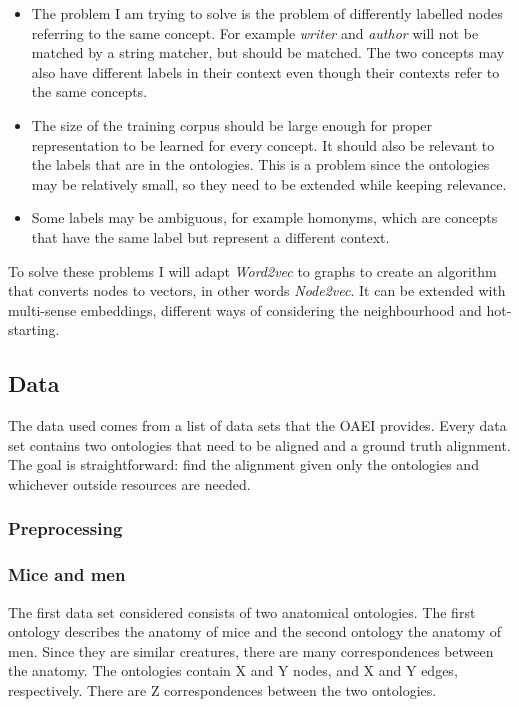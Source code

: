 \documentclass{article}
\begin{document}
 \begin{itemize}
  \item The problem I am trying to solve is the problem of differently labelled nodes referring to the same concept. For example \emph{writer} and \emph{author} will not be matched by a string matcher, but should be matched. The two concepts may also have different labels in their context even though their contexts refer to the same concepts.
  \item The size of the training corpus should be large enough for proper representation to be learned for every concept. It should also be relevant to the labels that are in the ontologies. This is a problem since the ontologies may be relatively small, so they need to be extended while keeping relevance.
  \item Some labels may be ambiguous, for example homonyms, which are concepts that have the same label but represent a different context.
 \end{itemize}
 
 To solve these problems I will adapt \emph{Word2vec} to graphs to create an algorithm that converts nodes to vectors, in other words \emph{Node2vec}. It can be extended with multi-sense embeddings, different ways of considering the neighbourhood and hot-starting.
 
  \subsection{Data}
 The data used comes from a list of data sets that the OAEI provides\cite{euzenat2013ontology}. %
 Every data set contains two ontologies that need to be aligned and a ground truth alignment. The goal is straightforward: find the alignment given only the ontologies and whichever outside resources are needed.

 \subsubsection{Preprocessing} \label{preprocessing}

 \subsubsection{Mice and men}
 The first data set considered consists of two anatomical ontologies. The first ontology describes the anatomy of mice and the second ontology the anatomy of men. Since they are similar creatures, there are many correspondences between the anatomy. The ontologies contain X and Y nodes, and X and Y edges, respectively. There are Z correspondences between the two ontologies.
\end{document}
